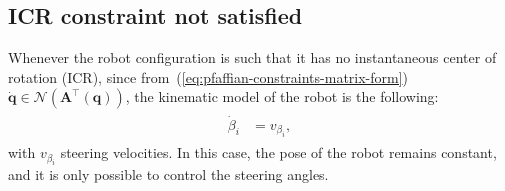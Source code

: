 \subsection{ICR constraint not satisfied}
Whenever the robot configuration is such that it has no instantaneous center of rotation (ICR), since from~(\ref{eq:pfaffian-constraints-matrix-form}) $\dot{\bm{q}} \in \mathcal{N}(\bm{A}^\top(\bm{q}))$, the kinematic model of the robot is the following:
\begin{align*}
\begin{split}
    \dot{\beta}_i &= v_{\beta_i},
\end{split}
\end{align*}
with $v_{\beta_i}$ steering velocities. In this case, the pose of the robot remains constant, and it is only possible to control the steering angles. 

